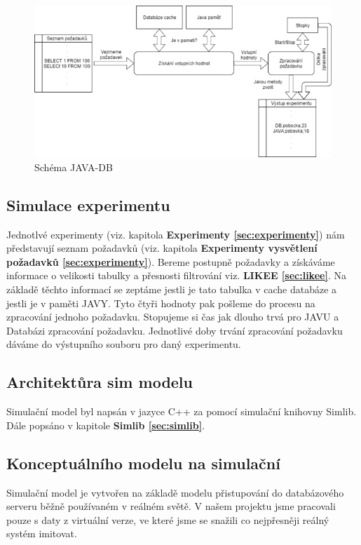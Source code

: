 \documentclass[a4paper, 11pt]{article}
\begin{document}
\begin{figure}[H]
\centering
\includegraphics[width=150mm]{images/JAVA-DB-schema.png}
\caption{Schéma JAVA-DB}
\label{sec:obr10}
\end{figure}

\subsection{Simulace experimentu} 
	 Jednotlvé experimenty (viz. kapitola \textbf{Experimenty \ref{sec:experimenty}}) nám představují seznam požadavků (viz. kapitola \textbf{Experimenty vysvětlení požadavků \ref{sec:experimenty}}). 
	Bereme postupně požadavky a získáváme informace o velikosti tabulky a přesnosti filtrování viz. \textbf{LIKEE \ref{sec:likee}}. Na základě těchto informací se zeptáme jestli je tato tabulka v cache databáze a jestli je v paměti JAVY. Tyto čtyři hodnoty pak pošleme do procesu na zpracování jednoho požadavku. Stopujeme si čas jak dlouho trvá pro JAVU a Databázi zpracování požadavku. Jednotlivé doby trvání zpracování požadavku dáváme do výstupního souboru pro daný experimentu. %


\subsection{Architektůra sim modelu}
Simulační model byl napsán v jazyce C++\cite{c++} za pomocí simulační knihovny Simlib\cite{simlib_web, simlib_zdroj}. Dále popsáno v kapitole \textbf{Simlib \ref{sec:simlib}}.

\subsection{Konceptuálního modelu na simulační}
Simulační model je vytvořen na základě modelu přistupování do databázového serveru běžně používaném v reálném světě. V našem projektu jsme pracovali pouze s daty z virtuální verze, ve které jsme se snažili co nejpřesněji reálný systém imitovat.
\end{document}

